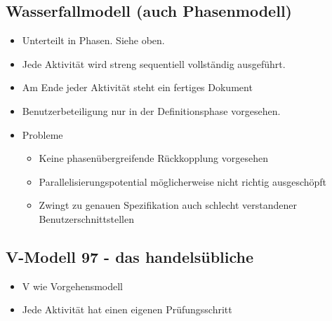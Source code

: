 \subsection{Wasserfallmodell (auch Phasenmodell)}
\begin{itemize}
    \item Unterteilt in Phasen. Siehe oben.
    \item Jede Aktivität wird streng sequentiell vollständig ausgeführt.
    \item Am Ende jeder Aktivität steht ein fertiges Dokument
    \item Benutzerbeteiligung nur in der Definitionsphase vorgesehen.
    \item Probleme
    \begin{itemize}
        \item Keine phasenübergreifende Rückkopplung vorgesehen
        \item Parallelisierungspotential möglicherweise nicht richtig ausgeschöpft
        \item Zwingt zu genauen Spezifikation auch schlecht verstandener Benutzerschnittstellen
    \end{itemize}
\end{itemize}

\newpage

\subsection{\glqq V-Modell 97 \grqq - das \glqq handelsübliche \grqq}
\begin{itemize}
    \item V wie Vorgehensmodell
    \item Jede Aktivität hat einen eigenen Prüfungsschritt
\end{itemize}
